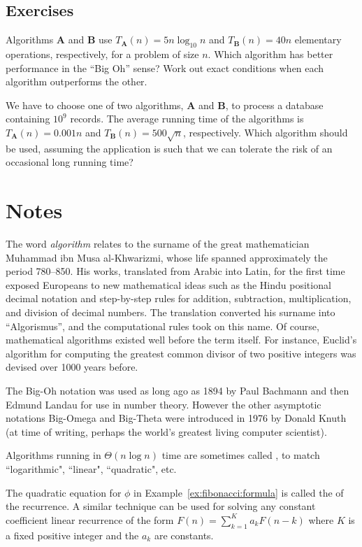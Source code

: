 \subsection*{Exercises}

\begin{Exercise}
\label{exr:alg-compar:1}
Algorithms \textbf{A} and \textbf{B} 
use \(T_\mathbf{A}(n) = 5n\log_{10}n\)
and \(T_\mathbf{B}(n) = 40n\) elementary operations, respectively,
for a problem of size \(n\). 
Which algorithm has better performance in the ``Big Oh'' sense? 
Work out exact conditions when each algorithm outperforms the other.
\end{Exercise}

\begin{Exercise}
\label{exr:alg-compar:2} We have to choose one of two algorithms, 
\textbf{A} and \textbf{B}, to process a database
containing $10^{9}$ records. The average running time 
of the algorithms is $T_{\mathbf{A}}(n) = 0.001n$ and
$T_{\mathbf{B}}(n) = 500\sqrt{n}$, 
respectively. Which algorithm  should be used, assuming the application is such 
that we can tolerate the risk of an occasional long running time?
\end{Exercise}


\section{Notes}

The word \emph{algorithm} relates to the surname of the great 
mathematician Mu\-ham\-mad ibn Musa al-Khwarizmi, whose life spanned approximately 
the period 780--850. His works, translated
from Arabic into Latin, for the first time exposed Europeans to new 
mathematical ideas such as the Hindu positional decimal notation and 
step-by-step rules for addition, subtraction, multiplication, and division of
 decimal numbers. The translation converted his surname into ``Algorismus'', 
 and the computational
rules took on this name. Of course, mathematical algorithms existed well  
before the term itself. For instance, Euclid's algorithm for
computing the greatest common divisor of two positive integers was devised over
1000 years before. 

The Big-Oh notation was used as long ago as 1894 by Paul Bachmann and then
 Edmund Landau for use in number theory. However the 
other asymptotic notations Big-Omega and Big-Theta were introduced in 1976 by 
Donald Knuth (at time of writing, perhaps the world's greatest living computer 
scientist).

Algorithms  running in $\Theta(n\log n)$ time are sometimes called 
, to match ``logarithmic", ``linear", ``quadratic", etc. 

The quadratic equation for \(\phi\) in Example~\ref{ex:fibonacci:formula}
is called the  of the recurrence.
A similar technique can be used for solving any constant coefficient linear 
recurrence of the form \(F(n)=\sum_{k=1}^{K}a_{k}F(n-k)\) where $K$ is a 
fixed positive integer and the $a_k$ are constants. 

